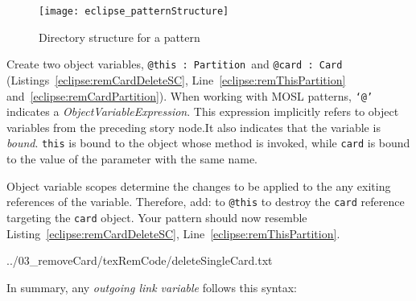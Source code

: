 \begin{itemize}

\begin{figure}[htp]
\begin{center}
  \texttt{[image: eclipse\_patternStructure]}
  \caption{Directory structure for a pattern}
  \label{eclipse:pattStruct}
\end{center}
\end{figure}

\itemWithRightTriangle Create two object variables, \texttt{{\color{VIOLET}@this} : Partition}~and \texttt{@card : Card}\\ (Listings~\ref{eclipse:remCardDeleteSC}, Line~\ref{eclipse:remThisPartition} and~\ref{eclipse:remCardPartition}). When working with MOSL patterns, \texttt{`@'} indicates a \emph{ObjectVariableExpression}. This expression implicitly refers to object variables from the preceding story node.It also indicates that the variable is \emph{bound}. \texttt{{\color{VIOLET}this}} is bound to the object whose method is invoked, while \texttt{card} is bound to the value of the parameter with the same name. 

\vspace{0.5cm}

\itemWithRightTriangle Object variable scopes determine the changes to be applied to the any exiting references of the variable. Therefore, add:
 to \texttt{{\color{VIOLET}@this}} to destroy the \texttt{card} reference targeting the \texttt{card} object. Your pattern should now resemble Listing~\ref{eclipse:remCardDeleteSC}, Line~\ref{eclipse:remThisPartition}. 


\vspace{0.5cm}


 {../03_removeCard/texRemCode/deleteSingleCard.txt}

\vspace{0.5cm}

\itemWithRightTriangle In summary, any \emph{outgoing link
 variable} follows this syntax:



\end{itemize}
